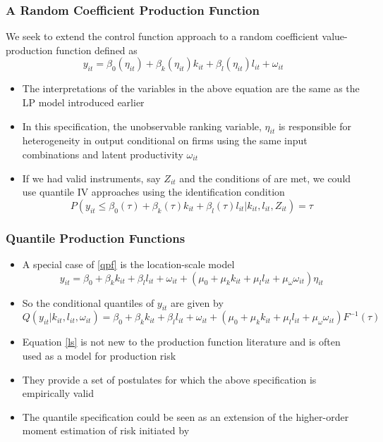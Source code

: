 \documentclass{beamer}
\begin{document}

\begin{frame}
\frametitle{A Random Coefficient Production Function}
We seek to extend the control function approach to a random coefficient value-production function defined as
\begin{equation} \label{qpf}
	y_{it}=\beta_{0}(\eta_{it})+\beta_{k}(\eta_{it})k_{it}+\beta_{l}(\eta_{it})l_{it}+\omega_{it}
\end{equation}
\begin{itemize}
	\item The interpretations of the variables in the above equation are the same as the LP model introduced earlier
	\item In this specification, the unobservable ranking variable, $\eta_{it}$ is responsible for heterogeneity in output conditional on firms using the same input combinations and latent productivity $\omega_{it}$
	\item If we had valid instruments, say $Z_{it}$ and the conditions of \textcite{Chernozhukov2005} are met, we could use quantile IV approaches using the identification condition
	\begin{equation}
	P(y_{it}\leq\beta_{0}(\tau)+\beta_{k}(\tau)k_{it}+\beta_{l}(\tau)l_{it}|k_{it}, l_{it}, Z_{it})=\tau
	\end{equation}
\end{itemize}
\end{frame}


\begin{frame}
\frametitle{Quantile Production Functions}
\begin{itemize}
	\item A special case of \eqref{qpf} is the location-scale model
	\small
	\begin{equation} \label{ls}
	y_{it}=\beta_{0}+\beta_{k}k_{it}+\beta_{l}l_{it}+\omega_{it}+(\mu_{0}+\mu_{k}k_{it}+\mu_{l}l_{it}+\mu_{\omega}\omega_{it})\eta_{it}
	\end{equation}
	\normalsize
	\item So the conditional quantiles of $y_{it}$ are given by
	\small
	\begin{equation}
	Q(y_{it}|k_{it}, l_{it}, \omega_{it})=\beta_{0}+\beta_{k}k_{it}+\beta_{l}l_{it}+\omega_{it}+(\mu_{0}+\mu_{k}k_{it}+\mu_{l}l_{it}+\mu_{\omega}\omega_{it})F^{-1}(\tau)
	\end{equation}
	\normalsize
	\item Equation \eqref{ls} is not new to the production function literature and is often used as a model for production risk \parencite{Just1978}
	\item They provide a set of postulates for which the above specification is empirically valid
	\item The quantile specification could be seen as an extension of the higher-order moment estimation of risk initiated by \textcite{Antle1983}
\end{itemize}
\end{frame}
\end{document}
